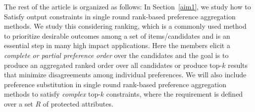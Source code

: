 \documentclass[11pt]{article}
\begin{document}
\smallskip \noindent The rest of the article is organized as follows:
\smallskip \noindent In Section~\ref{aim1}, we study how to Satisfy output constraints in single round rank-based preference aggregation methods.
We study this considering ranking, which is a commonly used method to prioritize  desirable outcomes among a set of items/candidates and is an essential step in  many high impact applications. Here the members elicit a {\em complete or partial preference order} over the candidates and the goal is to produce an aggregated ranked order over all candidates or produce top-$k$ results that minimize disagreements  among individual preferences. 
We will also include preference substitution in single round rank-based preference aggregation methods to satisfy {\em complex} top-$k$  constraints, where the  requirement is defined over a set $R$ of protected attributes. 
\end{document}
